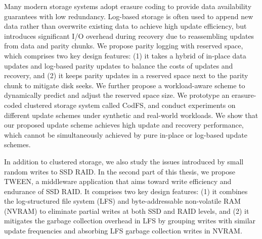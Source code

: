 Many modern storage systems adopt erasure coding to provide data availability
guarantees with low redundancy.  Log-based storage is often used to
append new data rather than overwrite existing data to achieve high
update efficiency, but introduces significant \mbox{I/O} overhead during recovery due
to reassembling updates from data and parity chunks.  We propose parity
logging with reserved space, which comprises two key design features: (1) it
takes a hybrid of in-place data updates and log-based parity updates to
balance the costs of updates and recovery, and (2) it keeps parity updates in
a reserved space next to the parity chunk to mitigate disk seeks.  We further
propose a workload-aware scheme to dynamically predict and adjust the reserved
space size.  We prototype an erasure-coded clustered storage system called
CodFS, and conduct experiments on different
update schemes under synthetic and real-world workloads.  We show that
our proposed update scheme achieves high update and recovery
performance, which cannot be simultaneously achieved by pure in-place or
log-based update schemes.

In addition to clustered storage, we also study the issues introduced by small random 
writes to SSD RAID. In the second part of this thesis, 
we propose TWEEN, a middleware application that aims toward write efficiency 
and endurance of SSD RAID.  It comprises two key design features: 
(1) it combines the log-structured file system (LFS) and byte-addressable 
non-volatile RAM (NVRAM) to eliminate partial writes at both SSD and RAID 
levels, and (2) it mitigates the garbage collection overhead in LFS by 
grouping writes with similar update frequencies and absorbing LFS 
garbage collection writes in NVRAM. 
